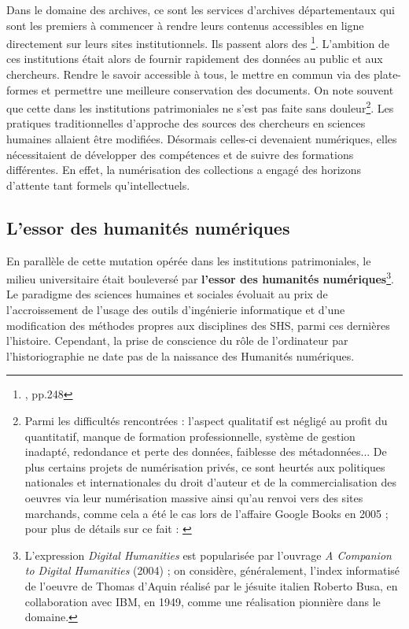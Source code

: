 Dans le domaine des archives, ce sont les services d'archives départementaux qui sont les premiers à commencer à rendre leurs contenus accessibles en ligne directement sur leurs sites institutionnels. Ils passent alors des \footnote{\cite{limon-bonnet_innovation_2019}, pp.248}. L'ambition de ces institutions était alors de fournir rapidement des données au public et aux chercheurs. Rendre le savoir accessible à tous, le mettre en commun via des plate-formes et permettre une meilleure conservation des documents.
On note souvent que cette  dans les institutions patrimoniales ne s'est pas faite sans douleur\footnote{Parmi les difficultés rencontrées : l'aspect qualitatif est négligé au profit du quantitatif, manque de formation professionnelle, système de gestion inadapté, redondance et perte des données, faiblesse des métadonnées... De plus certains projets de numérisation privés, ce sont heurtés aux politiques nationales et internationales du droit d'auteur et de la commercialisation des oeuvres via leur numérisation massive ainsi qu'au renvoi vers des sites marchands, comme cela a été le cas lors de l'affaire Google Books en 2005 ; pour plus de détails sur ce fait : \cite{jeanneney_quand_2010}}. Les pratiques traditionnelles d'approche des sources des chercheurs en sciences humaines allaient être modifiées. Désormais celles-ci devenaient numériques, elles nécessitaient de développer des compétences et de suivre des formations différentes. En effet, la numérisation des collections a engagé des horizons d'attente tant formels qu'intellectuels.

\subsection{L'essor des humanités numériques}\label{essor_humanités_num}

En parallèle de cette mutation opérée dans les institutions patrimoniales, le milieu universitaire était bouleversé par \textbf{l'essor des humanités numériques}\footnote{L'expression \textit{Digital Humanities} est popularisée par l'ouvrage \textit{A Companion to Digital Humanities} (2004) ; on considère, généralement, l'index informatisé de l'oeuvre de Thomas d'Aquin réalisé par le jésuite italien Roberto Busa, en collaboration avec IBM, en 1949, comme une réalisation pionnière dans le domaine.}. Le paradigme des sciences humaines et sociales évoluait au prix de l'accroissement de  l'usage des outils d'ingénierie informatique et d'une modification des méthodes propres aux disciplines des SHS, parmi ces dernières l'histoire. Cependant, la prise de conscience du rôle de l'ordinateur par l'historiographie ne date pas de la naissance des Humanités numériques.\\ 


